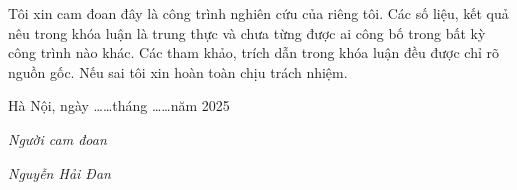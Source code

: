 \documentclass{uetgraduation}
\begin{document}
Tôi xin cam đoan đây là công trình nghiên cứu của riêng tôi. Các số liệu, kết quả nêu trong khóa luận là trung thực và chưa từng được ai công bố trong bất kỳ công trình nào khác. Các tham khảo, trích dẫn trong khóa luận đều được chỉ rõ nguồn gốc. Nếu sai tôi xin hoàn toàn chịu trách nhiệm.

\begin{flushright}
    Hà Nội, ngày \ldots\ldots tháng \ldots\ldots năm 2025

    \vspace{2cm}
    \textit{Người cam đoan}

    \vspace{1cm}
    \textit{Nguyễn Hải Đan}
\end{flushright}






\end{document}
